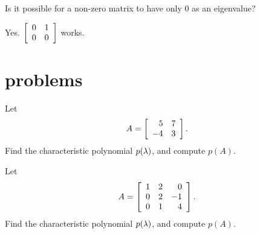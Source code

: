 \documentclass{ximera}
\begin{document}
\begin{problem}
  Is it possible for a non-zero matrix to have only $0$ as an eigenvalue?
  \vspace{1mm}
  \begin{solution}
    Yes. $\startmat{cc}
      0 & 1 \\
      0 & 0
    \stopmat$ works.
  \end{solution}
\end{problem}

\section*{problems}

\begin{problem}
  Let
  \begin{equation*}
    A = \startmat{rr}
      5 & 7 \\
      -4 & 3 \\
    \stopmat.
  \end{equation*}
  Find the characteristic polynomial $p(\eigenvar)$, and compute
  $p(A)$.
\end{problem}

\begin{problem}
  Let
  \begin{equation*}
    A = \startmat{rrr}
      1 & 2 & 0 \\
      0 & 2 & -1 \\
      0 & 1 & 4 \\
    \stopmat.
  \end{equation*}
  Find the characteristic polynomial $p(\eigenvar)$, and compute
  $p(A)$.
\end{problem}
\end{document}
